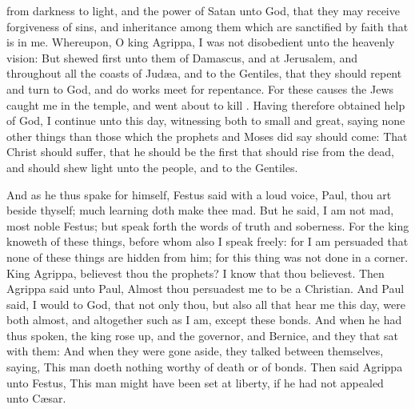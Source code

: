 {{{from
darkness
to
light,
and
{}
the power
of Satan
unto
God, that
they
may receive
forgiveness
of sins,
and
inheritance
among
them which
are sanctified
by faith
that is in
me.}}
Whereupon, O
king
Agrippa, I
was
not
disobedient unto the
heavenly
vision:
But
shewed
first unto
them
of
Damascus,
and at
Jerusalem,
and
throughout
all the
coasts of
Judæa,
and
{} to the
Gentiles, that they should
repent
and
turn
to
God, and
do
works
meet for
repentance.
For these
causes the
Jews
caught
me
in the
temple, and went
about to
kill
{}.
Having
therefore
obtained
help
of
God, I
continue
unto
this
day,
witnessing
both to
small
and
great,
saying
none other
things
than those
which the
prophets
and
Moses did
say
should
come:
That
Christ
should
suffer,
{}
that he should be the
first that should
rise
from the
dead, and should
shew
light unto the
people,
and to the
Gentiles.
\par }{\PP {}And as
he
thus spake for
himself,
Festus
said with a
loud
voice,
Paul, thou art beside
thyself;
much
learning doth
make
thee
mad.
But he
said, I
am
not
mad, most
noble
Festus;
but speak
forth the
words of
truth
and
soberness.
For the
king
knoweth
of these
things,
before
whom
also I
speak
freely:
for I am
persuaded that
none of these
things are hidden
from
him;
for this
thing
was
not
done
in a
corner.
King
Agrippa, believest
thou the
prophets? I
know
that thou
believest.
Then
Agrippa
said
unto
Paul,
Almost thou
persuadest
me to
be a
Christian.
And
Paul
said, I
would to
God,
that
not
only
thou,
but
also
all that
hear
me this
day,
were
both
almost,
and
altogether
such
as
I
am,
except
these
bonds.
And when
he
had
thus
spoken, the
king rose
up,
and the
governor,
and
Bernice,
and
they that
sat with
them:
And when they were gone
aside, they
talked
between
themselves,
saying,
This
man
doeth
nothing
worthy of
death
or of
bonds.
Then
said
Agrippa unto
Festus,
This
man might have
been set at
liberty,
if he
had
not
appealed unto
Cæsar.

}
